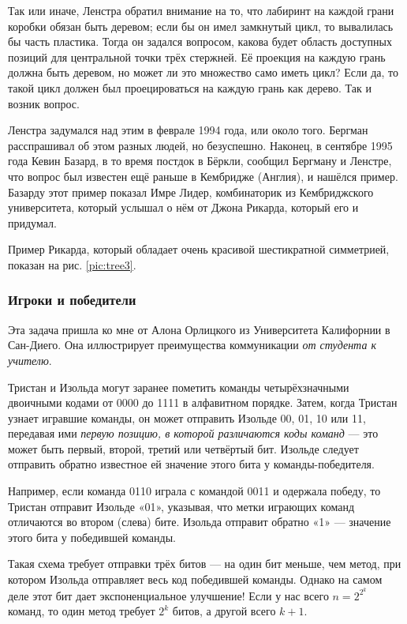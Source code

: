 Так или иначе, Ленстра обратил внимание на то, что лабиринт на каждой грани коробки обязан быть деревом;
если бы он имел замкнутый цикл, то вывалилась бы часть пластика.
Тогда он задался вопросом, какова будет область доступных позиций для центральной точки трёх стержней.
Её проекция на каждую грань должна быть деревом, но может ли это множество само иметь цикл?
Если да, то такой цикл должен был проецироваться на каждую грань как дерево.
Так и возник вопрос.

Ленстра задумался над этим в феврале 1994 года, или около того.
Бергман расспрашивал об этом разных людей, но безуспешно.
Наконец, в сентябре 1995 года Кевин Базард, в то время постдок в Бёркли, сообщил Бергману и Ленстре, что вопрос был известен ещё раньше в Кембридже (Англия), и нашёлся пример.
Базарду этот пример показал Имре Лидер, комбинаторик из Кембриджского университета, который услышал о нём от Джона Рикарда, который его и придумал.

Пример Рикарда, который обладает очень красивой шестикратной симметрией, показан на рис. \ref{pic:tree3}.

\subsubsection*{Игроки и победители}

Эта задача пришла ко мне от Алона Орлицкого из Университета Калифорнии в Сан-Диего.
Она иллюстрирует преимущества коммуникации \emph{от студента к учителю}.

Тристан и Изольда могут заранее пометить команды четырёхзначными двоичными кодами от 0000 до 1111 в алфавитном порядке.
Затем, когда Тристан узнает игравшие команды, он может отправить Изольде 00, 01, 10 или 11, передавая ими \emph{первую позицию, в которой различаются коды команд} --- это может быть первый, второй, третий или четвёртый бит.
Изольде следует отправить обратно известное ей значение этого бита у команды-победителя.

Например, если команда 0110 играла с командой 0011 и одержала победу,
то Тристан отправит Изольде «01», указывая, что метки играющих команд отличаются во втором (слева) бите.
Изольда отправит обратно «1» --- значение этого бита у победившей команды.

Такая схема требует отправки трёх битов --- на один бит меньше, чем метод, при котором Изольда отправляет весь код победившей команды.
Однако на самом деле этот бит дает экспоненциальное улучшение!
Если у нас всего $n = 2^{2^k}$ команд, то один метод требует $2^k$ битов, а другой всего $k + 1$.


